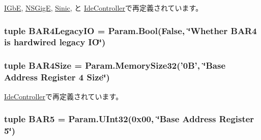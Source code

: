 \hyperlink{classEthernet_1_1IGbE_a563ca469426838df82cc266c302a0a70}{IGbE}, \hyperlink{classEthernet_1_1NSGigE_a563ca469426838df82cc266c302a0a70}{NSGigE}, \hyperlink{classEthernet_1_1Sinic_a563ca469426838df82cc266c302a0a70}{Sinic}, と \hyperlink{classIde_1_1IdeController_a563ca469426838df82cc266c302a0a70}{IdeController}で再定義されています。\hypertarget{classPci_1_1PciDevice_a1889f7678ee01aa35fe7794c3fcc5532}{
\subsubsection[{BAR4LegacyIO}]{\setlength{\rightskip}{0pt plus 5cm}tuple {\bf BAR4LegacyIO} = Param.Bool(False, \char`\"{}Whether {\bf BAR4} is hardwired legacy IO\char`\"{})}}
\label{classPci_1_1PciDevice_a1889f7678ee01aa35fe7794c3fcc5532}
\hypertarget{classPci_1_1PciDevice_ae076d620ed7c44d0096275df67e922e6}{
\subsubsection[{BAR4Size}]{\setlength{\rightskip}{0pt plus 5cm}tuple {\bf BAR4Size} = Param.MemorySize32('0B', \char`\"{}Base Address Register 4 Size\char`\"{})}}
\label{classPci_1_1PciDevice_ae076d620ed7c44d0096275df67e922e6}


\hyperlink{classIde_1_1IdeController_a41bfe3a2d21d011756368941585cc33f}{IdeController}で再定義されています。\hypertarget{classPci_1_1PciDevice_a9bc605ff9fcc9424477afc81fa73422e}{
\subsubsection[{BAR5}]{\setlength{\rightskip}{0pt plus 5cm}tuple {\bf BAR5} = Param.UInt32(0x00, \char`\"{}Base Address Register 5\char`\"{})}}
\label{classPci_1_1PciDevice_a9bc605ff9fcc9424477afc81fa73422e}


